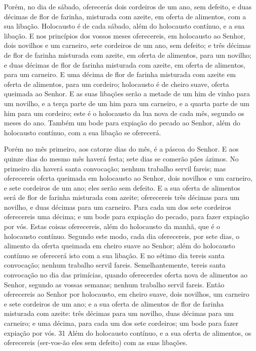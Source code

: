 Porém, no dia de sábado, oferecerás dois cordeiros de um ano, sem
defeito, e duas décimas de flor de farinha, misturada com azeite, em
oferta de alimentos, com a sua libação. Holocausto é de cada
sábado, além do holocausto contínuo, e a sua libação. E nos
princípios dos vossos meses oferecereis, em holocausto ao Senhor,
dois novilhos e um carneiro, sete cordeiros de um ano, sem defeito;
e três décimas de flor de farinha misturada com azeite, em
oferta de alimentos, para um novilho; e duas décimas de flor de
farinha misturada com azeite, em oferta de alimentos, para um
carneiro. E uma décima de flor de farinha misturada com
azeite em oferta de alimentos, para um cordeiro; holocausto é de
cheiro suave, oferta queimada ao Senhor. E as suas libações
serão a metade de um him de vinho para um novilho, e a terça parte
de um him para um carneiro, e a quarta parte de um him para um
cordeiro; este é o holocausto da lua nova de cada mês, segundo os
meses do ano. Também um bode para expiação do pecado ao
Senhor, além do holocausto contínuo, com a sua libação se oferecerá.

Porém no mês primeiro, aos catorze dias do mês, é a páscoa do
Senhor. E aos quinze dias do mesmo mês haverá festa; sete
dias se comerão pães ázimos. No primeiro dia haverá santa
convocação; nenhum trabalho servil fareis; mas oferecereis
oferta queimada em holocausto ao Senhor, dois novilhos e um
carneiro, e sete cordeiros de um ano; eles serão sem defeito.
E a sua oferta de alimentos será de flor de farinha misturada
com azeite; oferecereis três décimas para um novilho, e duas décimas
para um carneiro. Para cada um dos sete cordeiros oferecereis
uma décima; e um bode para expiação do pecado, para fazer
expiação por vós. Estas coisas oferecereis, além do
holocausto da manhã, que é o holocausto contínuo. Segundo
este modo, cada dia oferecereis, por sete dias, o alimento da oferta
queimada em cheiro suave ao Senhor; além do holocausto contínuo se
oferecerá isto com a sua libação. E no sétimo dia tereis
santa convocação; nenhum trabalho servil fareis.
Semelhantemente, tereis santa convocação no dia das
primícias, quando oferecerdes oferta nova de alimentos ao Senhor,
segundo as vossas semanas; nenhum trabalho servil fareis.
Então oferecereis ao Senhor por holocausto, em cheiro suave,
dois novilhos, um carneiro e sete cordeiros de um ano; e a
sua oferta de alimentos de flor de farinha misturada com azeite:
três décimas para um novilho, duas décimas para um carneiro;
e uma décima, para cada um dos sete cordeiros; um bode
para fazer expiação por vós. 31 Além do holocausto contínuo, e a sua
oferta de alimentos, os oferecereis (ser-vos-ão eles sem defeito)
com as suas libações.

